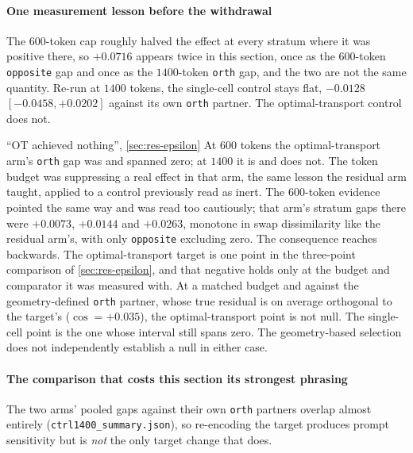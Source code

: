 \paragraph{One measurement lesson before the withdrawal} The $600$-token cap
roughly halved the effect at every stratum where it was positive there, so
$+0.0716$ appears twice in this section, once as the $600$-token
\texttt{opposite} gap and once as the $1400$-token \texttt{orth} gap, and the two
are not the same quantity. Re-run at $1400$ tokens, the single-cell control stays
flat, $-0.0128$ \nolinebreak[3]$[-0.0458, +0.0202]$ against its own
\texttt{orth} partner. The optimal-transport control does not.

%
\begin{withdrawn}{``OT achieved nothing'', \cref{sec:res-epsilon}}
At $600$ tokens the optimal-transport arm's \texttt{orth} gap was
 and spanned zero; at $1400$ it is
 and does not. The token budget was suppressing a
real effect in that arm, the same lesson the residual arm taught, applied to a
control previously read as inert. The $600$-token evidence pointed the same way
and was read too cautiously; that arm's stratum gaps there were $+0.0073$,
$+0.0144$ and $+0.0263$, monotone in swap dissimilarity like the residual arm's,
with only \texttt{opposite} excluding zero. The consequence reaches backwards.
The optimal-transport target is one point in the three-point comparison of
\cref{sec:res-epsilon}, and that negative holds only at the budget and comparator
it was measured with. At a matched budget and against the geometry-defined
\texttt{orth} partner, whose true residual is on average orthogonal to the
target's ($\cos = +0.035$), the optimal-transport point is not null. The
single-cell point is the one whose interval still spans zero. The geometry-based
selection does not independently establish a null in either case.
\end{withdrawn}

\paragraph{The comparison that costs this section its strongest phrasing} The two
arms' pooled gaps against their own \texttt{orth} partners overlap almost
entirely (\texttt{ctrl1400\_summary.json}), so re-encoding the target produces
prompt sensitivity but is \emph{not} the only target change that does.

